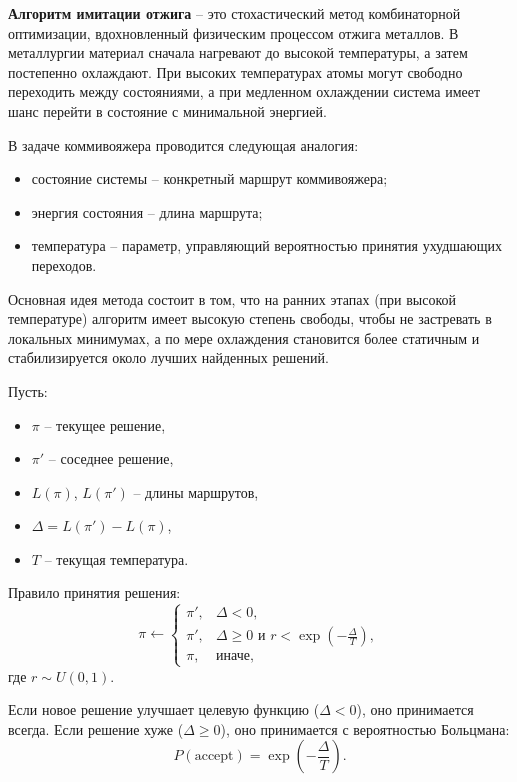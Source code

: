 \documentclass[12pt,a4paper]{article}
\begin{document}
\textbf{Алгоритм имитации отжига} -- это стохастический метод комбинаторной оптимизации,
вдохновленный физическим процессом отжига металлов. В металлургии материал сначала
нагревают до высокой температуры, а затем постепенно охлаждают. При высоких температурах
атомы могут свободно переходить между состояниями, а при медленном охлаждении система
имеет шанс перейти в состояние с минимальной энергией.

В задаче коммивояжера проводится следующая аналогия:
\begin{itemize}
    \item состояние системы -- конкретный маршрут коммивояжера;
    \item энергия состояния -- длина маршрута;
    \item температура -- параметр, управляющий вероятностью принятия ухудшающих переходов.
\end{itemize}

Основная идея метода состоит в том, что на ранних этапах (при высокой температуре)
алгоритм имеет высокую степень свободы, чтобы не застревать в локальных
минимумах, а по мере охлаждения становится более статичным и стабилизируется около
лучших найденных решений.

Пусть:
\begin{itemize}
    \item $\pi$ -- текущее решение,
    \item $\pi'$ -- соседнее решение,
    \item $L(\pi)$, $L(\pi')$ -- длины маршрутов,
    \item $\Delta = L(\pi') - L(\pi)$,
    \item $T$ -- текущая температура.
\end{itemize}

Правило принятия решения:
\begin{equation}
\pi \leftarrow
\begin{cases}
\pi', & \Delta < 0, \\
\pi', & \Delta \ge 0 \text{ и } r < \exp\left(-\frac{\Delta}{T}\right), \\
\pi, & \text{иначе},
\end{cases}
\end{equation}
где $r \sim U(0,1)$.

Если новое решение улучшает целевую функцию ($\Delta < 0$), оно принимается всегда.
Если решение хуже ($\Delta \ge 0$), оно принимается с вероятностью Больцмана:
\begin{equation}
P(\text{accept}) = \exp\left(-\frac{\Delta}{T}\right).
\end{equation}
\end{document}

